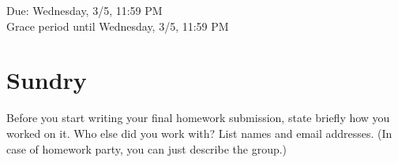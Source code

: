 \documentclass[11pt]{article}
\begin{document}
\maketitle
\fontsize{12}{15}\selectfont

\begin{center}
    Due: Wednesday, 3/5, 11:59 PM \\
    Grace period until Wednesday, 3/5, 11:59 PM \\
\end{center}

\section*{Sundry}
Before you start writing your final homework submission, state briefly how you worked on it.  Who else did you work with?  List names and email addresses.  (In case of homework party, you can just describe the group.)

\vspace{15pt}

\end{document}
